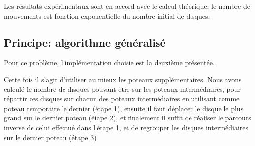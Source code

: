 \documentclass[a4paper, 11pt]{article}%
\begin{document}
		Les résultats expérimentaux sont en accord avec
		le calcul théorique: le nombre de mouvements
		est fonction exponentielle du nombre
		initial de disques.
	
	\subsection{Principe: algorithme généralisé}
		Pour ce problème, l'implémentation choisie est la deuxième présentée.
		
		Cette fois il s'agit d'utiliser au mieux les poteaux supplémentaires.
		Nous avons calculé le nombre de disques pouvant être sur les poteaux
		intermédiaires, pour répartir ces disques sur chacun des poteaux intermédiaires
		en utilisant comme poteau temporaire le dernier (étape 1), ensuite il faut
		déplacer le disque le plus grand sur le dernier poteau (étape 2), et finalement
		il suffit de réaliser le parcours inverse de celui effectué dans l'étape 1,
		et de regrouper les disques intermédiaires sur le dernier poteau (étape 3).
		
\end{document}

